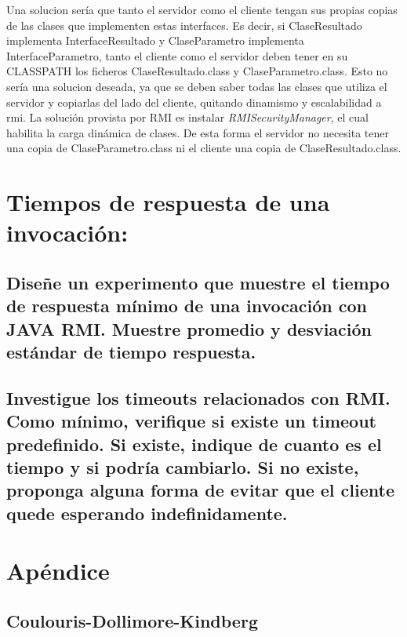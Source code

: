 \documentclass[osajnl,twocolumn,showpacs,superscriptaddress,10pt]{revtex4-1} %
\begin{document}
Una solucion sería que  tanto el servidor como el cliente tengan sus propias copias de las clases que implementen estas interfaces. Es decir, si ClaseResultado implementa InterfaceResultado y ClaseParametro implementa InterfaceParametro, tanto el cliente como el servidor deben tener en su CLASSPATH los ficheros ClaseResultado.class y ClaseParametro.class. Esto no sería una solucion deseada, ya que se deben saber todas las clases que utiliza el servidor y copiarlas del lado del cliente, quitando dinamismo y escalabilidad a rmi.
La solución provista por RMI es instalar \textit{RMISecurityManager}, el cual habilita la carga dinámica de clases. De esta forma el servidor no necesita tener una copia de ClaseParametro.class ni el cliente una copia de ClaseResultado.class. 

\section{Tiempos de respuesta de una invocación:}

\subsection{Diseñe un experimento que muestre el tiempo de respuesta mínimo de una invocación con
JAVA RMI. Muestre promedio y desviación estándar de tiempo respuesta.}

\subsection{Investigue los timeouts relacionados con RMI. Como mínimo, verifique si existe un timeout
predefinido. Si existe, indique de cuanto es el tiempo y si podría cambiarlo. Si no existe,
proponga alguna forma de evitar que el cliente quede esperando indefinidamente.}

\section{Apéndice}

\subsection{Coulouris-Dollimore-Kindberg} \label{apendix:1a}
\end{document}
